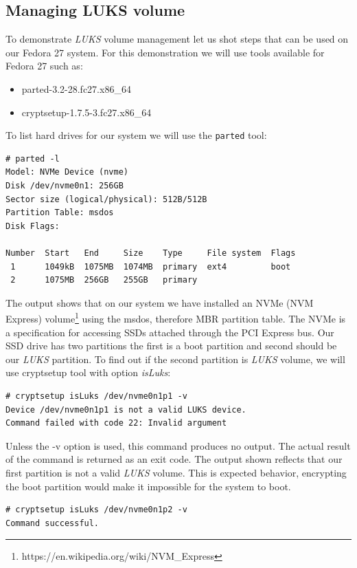 \subsection{Managing LUKS volume}

To demonstrate {\it LUKS} volume management let us shot steps that can be used on our Fedora 27 system.
For this demonstration we will use tools available for Fedora 27 such as:\\
\begin{itemize}
    \item parted-3.2-28.fc27.x86\_64
    \item cryptsetup-1.7.5-3.fc27.x86\_64
\end{itemize}
To list hard drives for our system we will use the {\tt parted} tool:
\begin{lstlisting}[columns=fixed,basicstyle=\ttfamily\footnotesize,tabsize=4,backgroundcolor=\color{yellow!10}]
# parted -l
Model: NVMe Device (nvme)
Disk /dev/nvme0n1: 256GB
Sector size (logical/physical): 512B/512B
Partition Table: msdos
Disk Flags:

Number  Start   End     Size    Type     File system  Flags
 1      1049kB  1075MB  1074MB  primary  ext4         boot
 2      1075MB  256GB   255GB   primary
\end{lstlisting}
The output shows that on our system we have installed an NVMe (NVM Express) volume\footnote{https://en.wikipedia.org/wiki/NVM\_Express} using the msdos, therefore MBR partition table.
The NVMe is a specification for accessing SSDs attached through the PCI Express bus.
Our SSD drive has two partitions the first is a boot partition and second should be our {\it LUKS} partition.
To find out if the second partition is {\it LUKS} volume, we will use cryptsetup tool with option {\it isLuks}:
\begin{lstlisting}[columns=fixed,basicstyle=\ttfamily\footnotesize,tabsize=4,backgroundcolor=\color{yellow!10}]
# cryptsetup isLuks /dev/nvme0n1p1 -v
Device /dev/nvme0n1p1 is not a valid LUKS device.
Command failed with code 22: Invalid argument
\end{lstlisting}
Unless the -v option is used, this command produces no output.
The actual result of the command is returned as an exit code.
The output shown reflects that our first partition is not a valid {\it LUKS} volume.
This is expected behavior, encrypting the boot partition would make it impossible for the system to boot.
\begin{lstlisting}[columns=fixed,basicstyle=\ttfamily\footnotesize,tabsize=4,backgroundcolor=\color{yellow!10}]
# cryptsetup isLuks /dev/nvme0n1p2 -v
Command successful.
\end{lstlisting}
